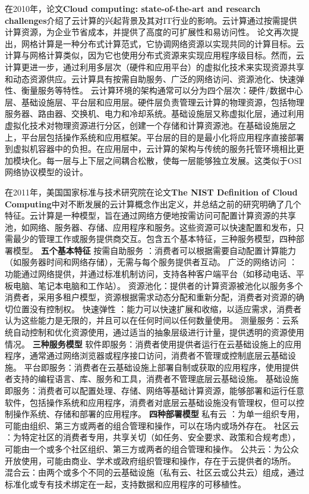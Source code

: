 \documentclass[a4paper,twoside]{scrbook}
\begin{document}
在2010年，论文\textbf{Cloud computing: state-of-the-art and research challenges}介绍了云计算的兴起背景及其对IT行业的影响。云计算通过按需提供计算资源，为企业节省成本，并提供了高度的可扩展性和易访问性。
论文再次提出，网格计算是一种分布式计算范式，它协调网络资源以实现共同的计算目标。云计算与网格计算类似，因为它也使用分布式资源来实现应用程序级目标。然而，云计算更进一步，通过利用多层次（硬件和应用平台）的虚拟化技术来实现资源共享和动态资源供应。云计算具有按需自助服务、广泛的网络访问、资源池化、快速弹性、衡量服务等特性。
云计算环境的架构通常可以分为四个层次：硬件/数据中心层、基础设施层、平台层和应用层。硬件层负责管理云计算的物理资源，包括物理服务器、路由器、交换机、电力和冷却系统。基础设施层又称虚拟化层，通过利用虚拟化技术对物理资源进行分区，创建一个存储和计算资源池。在基础设施层之上，平台层包括操作系统和应用框架。平台层的目的是最小化将应用程序直接部署到虚拟机容器中的负担。在应用层中，云计算的架构与传统的服务托管环境相比更加模块化。每一层与上下层之间耦合松散，使每一层能够独立发展。这类似于OSI 网络协议模型的设计。

在2011年，美国国家标准与技术研究院在论文\textbf{The NIST Definition of Cloud  Computing}中对不断发展的云计算概念作出定义，并总结之前的研究明确了几个特征。云计算是一种模型，旨在通过网络方便地按需访问可配置计算资源的共享池，如网络、服务器、存储、应用程序和服务。这些资源可以快速配置和发布，只需最少的管理工作或服务提供商交互。包含五个基本特征，三种服务模型，四种部署模型。
\textbf{五个基本特征}
按需自助服务 ：消费者可以根据需要自动配置计算能力（如服务器时间和网络存储），无需与每个服务提供者互动。
广泛的网络访问 ：功能通过网络提供，并通过标准机制访问，支持各种客户端平台（如移动电话、平板电脑、笔记本电脑和工作站）。
资源池化：提供者的计算资源被池化以服务多个消费者，采用多租户模型，资源根据需求动态分配和重新分配，消费者对资源的确切位置没有控制权。
快速弹性 ：能力可以快速扩展和收缩，以适应需求，消费者认为这些能力是无限的，并且可以在任何时间以任何数量使用。
测量服务：云系统自动控制和优化资源使用，通过适当的抽象层级进行计量，提供透明的资源使用情况。
\textbf{三种服务模型}
软件即服务：消费者使用提供者运行在云基础设施上的应用程序，通常通过网络浏览器或程序接口访问，消费者不管理或控制底层云基础设施。
平台即服务：消费者在云基础设施上部署自制或获取的应用程序，使用提供者支持的编程语言、库、服务和工具，消费者不管理底层云基础设施。
基础设施即服务：消费者可以配置处理、存储、网络等基础计算资源，能够部署和运行任意软件，包括操作系统和应用程序，消费者对底层云基础设施没有管理权，但可以控制操作系统、存储和部署的应用程序。
\textbf{四种部署模型}
私有云 ：为单一组织专用，可能由组织、第三方或两者的组合管理和操作，可以在场内或场外存在。
社区云 ：为特定社区的消费者专用，共享关切（如任务、安全要求、政策和合规考虑），可能由一个或多个社区组织、第三方或两者的组合管理和操作。
公共云：为公众开放使用，可能由商业、学术或政府组织管理和操作，存在于云提供者的场所。
混合云：由两个或多个不同的云基础设施（私有云、社区云或公共云）组成，通过标准化或专有技术绑定在一起，支持数据和应用程序的可移植性。
\end{document}
